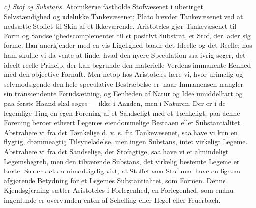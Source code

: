 \documentclass[12pt,a4paper]{book}
\newcommand{\runin}[1]{\emph{#1}\hspace{0.4em}}
\begin{document}
\runin{c) Stof og Substans.} Atomikerne fastholde Stofvæsenet i ubetinget
Selvstændighed og udelukke Tankevæsenet; Plato hævder Tankevæsenet ved at
nedsætte Stoffet til Skin af et Ikkeværende. Aristoteles gjør Tankevæsenet til
Form og Sandselighedscomplementet til et positivt Substrat, et Stof, der lader
sig forme. Han anerkjender med en vis Ligelighed baade det Ideelle og det
Reelle; hos ham skulde vi da vente at finde, hvad den nyere Speculation saa
ivrig søger, det ideelt-reelle Princip, der kan begrunde den materielle
Verdens immanente Eenhed med den objective Fornuft.
Men netop hos Aristoteles lære vi, hvor urimelig og selvmodsigende den hele
speculative Bestræbelse er, naar Immanensen mangler sin transcendente
Forudsætning, og Eenheden af Natur og Idee umiddelbart og paa første Haand
skal søges --- ikke i Aanden, men i Naturen. Der er i de legemlige Ting en
egen Forening af et Sandseligt med et Tænkeligt; paa denne Forening beroer
ethvert Legemes eiendommelige Bestaaen eller Substantialitet. Abstrahere vi
fra det Tænkelige d. v. s. fra Tankevæsenet, saa have vi kun en flygtig,
drømmeagtig Tilsyneladelse, men ingen Substans, intet virkeligt Legeme.
Abstrahere vi fra det Sandselige, det Stofagtige, saa have vi et almindeligt
Legemsbegreb, men den tilværende Substans, det virkelig bestemte Legeme er
borte. Saa er det da uimodsigelig vist, at Stoffet som Stof maa have en
ligesaa afgjørende Betydning for et Legemes Substantialitet, som Formen. Denne
Kjendsgjerning sætter Aristoteles i Forlegenhed, en Forlegenhed, som endnu
ingenlunde er overvunden enten af Schelling eller Hegel eller Feuerbach.
\end{document}
